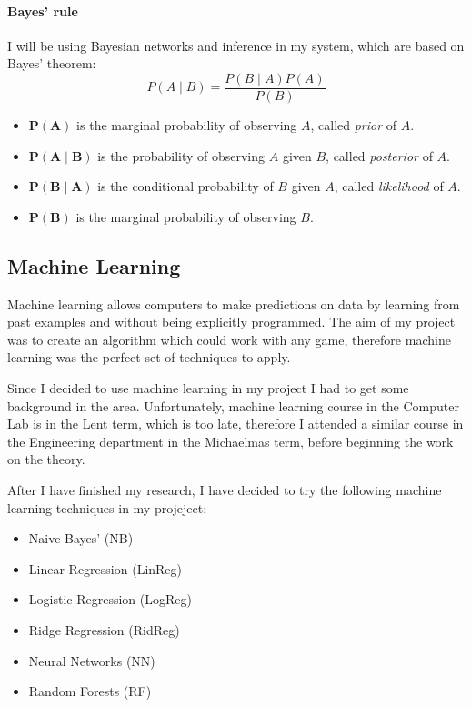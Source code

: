 \documentclass[12pt,a4paper]{book}
\newcommand\bs[1]{\boldsymbol{#1}}
\begin{document}
\paragraph{Bayes' rule}
I will be using Bayesian networks and inference in my system, which are based on Bayes' theorem:
\begin{equation*}
P(A\mid B) = \frac{P(B\mid A)P(A)}{P(B)}
\end{equation*}
\begin{itemize}
\item $\boldsymbol{P(A)}$ is the marginal probability of observing $A$, called \emph{prior} of $A$.
\item $\boldsymbol{P(A \mid B)}$ is the probability of observing $A$ given $B$, called \emph{posterior} of $A$.
\item $\boldsymbol{P(B \mid A)}$ is the conditional probability of $B$ given $A$, called \emph{likelihood} of $A$.
\item $\bs{P(B)}$ is the marginal probability of observing $B$.
\end{itemize}
\subsection{Machine Learning}
Machine learning allows computers to make predictions on data by learning from past examples and without being explicitly programmed.
The aim of my project was to create an algorithm which could work with any game, therefore machine learning was the perfect set of techniques to apply.

Since I decided to use machine learning in my project I had to get some background in the area.
Unfortunately, machine learning course in the Computer Lab is in the Lent term, which is too late, therefore I attended a similar course in the Engineering department in the Michaelmas term, before beginning the work on the theory.

After I have finished my research, I have decided to try the following machine learning techniques in my projeject:
\begin{itemize}
\item Naive Bayes' (NB)
\item Linear Regression (LinReg)
\item Logistic Regression (LogReg)
\item Ridge Regression (RidReg)
\item Neural Networks (NN)
\item Random Forests (RF)
\end{itemize}
\end{document}
